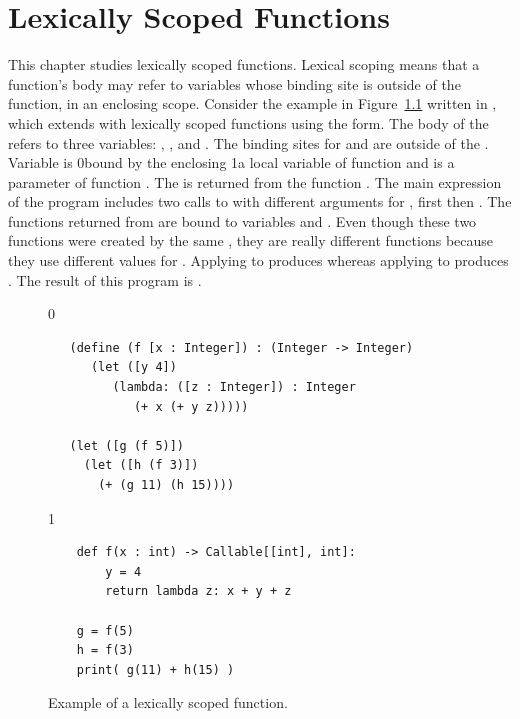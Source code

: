 \documentclass[7x10,nocrop]{TimesAPriori_MIT}%
\def\racketEd{0}
\def\pythonEd{1}
\def\edition{1}
\newcommand{\racket}[1]{{\if\edition\racketEd{#1}\fi}}
\newcommand{\python}[1]{{\if\edition\pythonEd #1\fi}}
\begin{document}




\chapter{Lexically Scoped Functions}
\label{ch:Llambda}

This chapter studies lexically scoped functions. Lexical scoping means
that a function's body may refer to variables whose binding site is
outside of the function, in an enclosing scope.
%
Consider the example in Figure~\ref{fig:lexical-scoping} written in
\LangLam{}, which extends \LangFun{} with lexically scoped functions
using the  form.  The body of the  refers to
three variables: , , and . The binding sites
for  and  are outside of the . Variable
 is \racket{bound by the enclosing }\python{a local
  variable of function } and  is a parameter of
function . The  is returned from the function
. The main expression of the program includes two calls to
 with different arguments for , first  then
. The functions returned from  are bound to variables
 and . Even though these two functions were created by
the same , they are really different functions because
they use different values for . Applying  to 
produces  whereas applying  to  produces
. The result of this program is .

\begin{figure}[btp]
{\if\edition\racketEd
\begin{lstlisting}
   (define (f [x : Integer]) : (Integer -> Integer)
      (let ([y 4])
         (lambda: ([z : Integer]) : Integer
            (+ x (+ y z)))))

   (let ([g (f 5)])
     (let ([h (f 3)])
       (+ (g 11) (h 15))))
\end{lstlisting}
\fi}
{\if\edition\pythonEd
\begin{lstlisting}
    def f(x : int) -> Callable[[int], int]:
        y = 4
        return lambda z: x + y + z

    g = f(5)
    h = f(3)
    print( g(11) + h(15) )
\end{lstlisting}
\fi}
\caption{Example of a lexically scoped function.}
\label{fig:lexical-scoping}
\end{figure}
\end{document}
